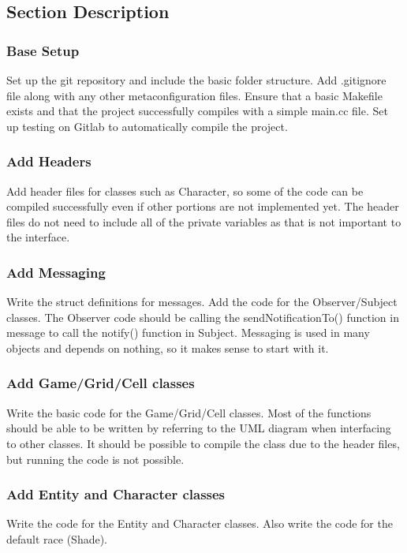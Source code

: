 \documentclass[12pt]{article}
\begin{document}
\subsection*{Section Description}
\subsubsection*{Base Setup}
Set up the git repository and include the basic folder structure. Add .gitignore file along with any other metaconfiguration files. Ensure that a basic Makefile exists and that the project successfully compiles with a simple main.cc file. Set up testing on Gitlab to automatically compile the project.


\subsubsection*{Add Headers}
Add header files for classes such as Character, so some of the code can be compiled successfully even if other portions are not implemented yet. The header files do not need to include all of the private variables as that is not important to the interface.


\subsubsection*{Add Messaging}
Write the struct definitions for messages. Add the code for the Observer/Subject classes. The Observer code should be calling the sendNotificationTo() function in message to call the notify() function in Subject. Messaging is used in many objects and depends on nothing, so it makes sense to start with it.


\subsubsection*{Add Game/Grid/Cell classes}
Write the basic code for the Game/Grid/Cell classes. Most of the functions should be able to be written by referring to the UML diagram when interfacing to other classes. It should be possible to compile the class due to the header files, but running the code is not possible.


\subsubsection*{Add Entity and Character classes}
Write the code for the Entity and Character classes. Also write the code for the default race (Shade).
\end{document}
